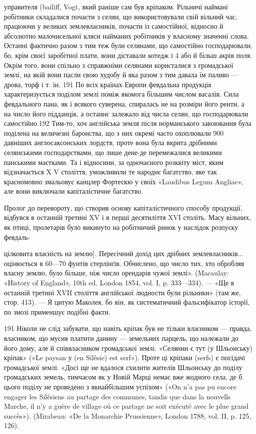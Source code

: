 управителя (bailiff, Vogt, який раніше сам був кріпаком. Рільничі
наймані робітники складалися почасти з селян, що використовували
свій вільний час, працюючи у великих землевласників,
почасти із самостійної, відносно й абсолютно малочисельної
кляси найманих робітників у власному значенні слова. Останні
фактично разом з тим теж були селянами, що самостійно господарювали,
бо, крім своєї заробітної плати, вони діставали котедж
і 4 або й більш акрів поля. Окрім того, вони спільно з справжніми
селянами користалися з громадської землі, на якій вони пасли
свою худобу й яка разом з тим давала їм паливо — дрова, торф
і т. ін. 191 По всіх країнах Европи февдальна продукція характеризується
поділом землі поміж якомога більшим числом васалів.
Сила февдального пана, як і всякого суверена, спиралась не на
розміри його ренти, а на число його підданців, а останнє залежало
від числа селян, що господарювали самостійно.192 Тим-то,
хоч англійська земля після норманського завоювання була
поділена на величезні баронства, що з них окремі часто охоплювали
900 давніших англосаксонських лордств, проте вона була
вкрита дрібними селянськими господарствами, що лише дене-де
перемежалися великими панськими маєтками. Та і відносини,
за одночасного розквіту міст, яким відзначається X V століття,
уможливили те народнє багатство, яке так красномовно
змальовує канцлер Фортескю у своїх «Laudibus Legum Angliae»,
але вони виключали капіталістичне багатство.

Пролог до перевороту, що створив основу капіталістичного
способу продукції, відбувся в останній третині XV і в перші
десятиліття XVI століть. Масу вільних, як птиці, пролетарів
було викинуто на робітничий ринок у наслідок розпуску февдаль-

цілковита власність на землю]. Пересічний дохід цих дрібних землевласників...
оцінюється в 60—70 фунтів стерлінґів. Обчислено, що число
тих, хто обробляв власну землю, було більше, ніж число орендарів чужої
землі». (Macaulay: «History of England», 10th ed. London 1854,
vol. I, p. 333—334). — «Ще в останній третині XVII століття  англійської
людности були рільники» (там же, стор. 413). — Я цитую Маколея,
бо він, як систематичний фальсифікатор історії, по змозі применшує
подібні факти.

191 Ніколи не слід забувати, що навіть кріпак був не тільки власником
— правда, власником, що мусив платити данину — земельних
парцель, що належали до його дому, але й співвласником громадської
землі. «Селянин є тут (у Шльонську) кріпак» («Le paysan у (en Silésie)
est serf»). Проте ці кріпаки (serfs) є посідачі громадської землі. «Досі
ще не вдалося схилити жителів Шльонську до поділу громадських
земель, тимчасом як у Новій Марці немає вже жодного села, де б цього
поділу не проведено з якнайбільшим успіхом» («On n’a pas pu encore
engager les Silésiens au partage des communes, tandis que dans la nouvells
Marche, il n’y a guère de village où ce partage ne soit exécuté avec le plue
grand succès»). (Mirabeau: «De la Monarchie Prussienne», London 1788,
vol. II, p. 125, 126).

